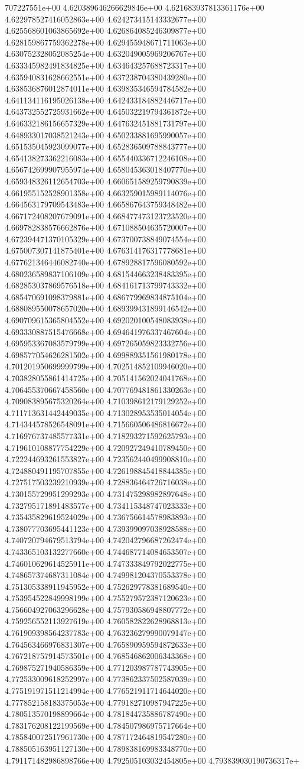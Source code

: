 707227551e+00	4.620389646266629846e+00	4.621683937813361176e+00	4.622978527416052863e+00	4.624273415143332677e+00	4.625568601063865692e+00	4.626864085246309877e+00	4.628159867759362278e+00	4.629455948671711063e+00	4.630752328052085254e+00	4.632049005969206767e+00	4.633345982491834825e+00	4.634643257688723317e+00	4.635940831628662551e+00	4.637238704380439280e+00	4.638536876012874011e+00	4.639835346594784582e+00	4.641134116195026138e+00	4.642433184882446717e+00	4.643732552725931662e+00	4.645032219794361872e+00	4.646332186156657329e+00	4.647632451881731797e+00	4.648933017038521243e+00	4.650233881695990057e+00	4.651535045923099077e+00	4.652836509788843777e+00	4.654138273362216083e+00	4.655440336712246108e+00	4.656742699907955974e+00	4.658045363018407770e+00	4.659348326112654703e+00	4.660651589259790839e+00	4.661955152528901358e+00	4.663259015989114076e+00	4.664563179709543483e+00	4.665867643759348482e+00	4.667172408207679091e+00	4.668477473123723520e+00	4.669782838576662876e+00	4.671088504635720007e+00	4.672394471370105329e+00	4.673700738849074554e+00	4.675007307141875401e+00	4.676314176317778681e+00	4.677621346446082740e+00	4.678928817596080592e+00	4.680236589837106109e+00	4.681544663238483395e+00	4.682853037869576518e+00	4.684161713799743332e+00	4.685470691098379881e+00	4.686779969834875104e+00	4.688089550078657020e+00	4.689399431899146542e+00	4.690709615365804552e+00	4.692020100548083938e+00	4.693330887515476668e+00	4.694641976337467604e+00	4.695953367083579799e+00	4.697265059823332756e+00	4.698577054626281502e+00	4.699889351561980178e+00	4.701201950699999799e+00	4.702514852109946020e+00	4.703828055861414725e+00	4.705141562024041768e+00	4.706455370667458560e+00	4.707769481861330263e+00	4.709083895675320264e+00	4.710398612179129252e+00	4.711713631442449035e+00	4.713028953535014054e+00	4.714344578526548091e+00	4.715660506486816672e+00	4.716976737485577331e+00	4.718293271592625793e+00	4.719610108877754229e+00	4.720927249410789450e+00	4.722244693261553827e+00	4.723562440499908810e+00	4.724880491195707855e+00	4.726198845418844385e+00	4.727517503239210939e+00	4.728836464726716038e+00	4.730155729951299293e+00	4.731475298982897648e+00	4.732795171891483577e+00	4.734115348747023333e+00	4.735435829619524029e+00	4.736756614578983893e+00	4.738077703695441123e+00	4.739399097038928588e+00	4.740720794679513794e+00	4.742042796687262474e+00	4.743365103132277660e+00	4.744687714084653507e+00	4.746010629614525911e+00	4.747333849792022775e+00	4.748657374687311084e+00	4.749981204370553378e+00	4.751305338911945952e+00	4.752629778381689540e+00	4.753954522849998199e+00	4.755279572387120623e+00	4.756604927063296628e+00	4.757930586948807772e+00	4.759256552113927619e+00	4.760582822628968813e+00	4.761909398564237783e+00	4.763236279990079147e+00	4.764563466976831307e+00	4.765890959594872633e+00	4.767218757914573501e+00	4.768546862006343368e+00	4.769875271940586359e+00	4.771203987787743905e+00	4.772533009618252997e+00	4.773862337502587039e+00	4.775191971511214994e+00	4.776521911714644020e+00	4.777852158183375053e+00	4.779182710987947225e+00	4.780513570198899664e+00	4.781844735886787490e+00	4.783176208122199569e+00	4.784507986975717664e+00	4.785840072517961730e+00	4.787172464819547280e+00	4.788505163951127130e+00	4.789838169983348770e+00	4.791171482986898766e+00	4.792505103032454805e+00	4.793839030190736317e+